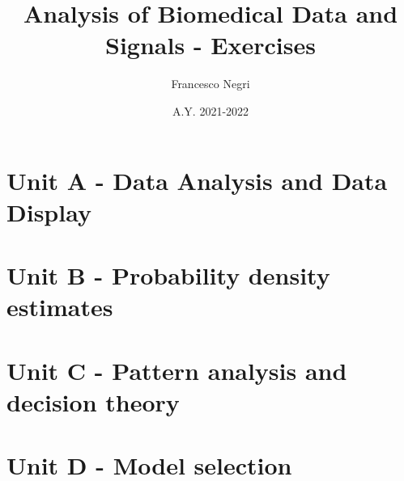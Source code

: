 \documentclass[12pt]{article}
\title{Analysis of Biomedical Data and Signals - Exercises}
\author{Francesco Negri}
\date{A.Y. 2021-2022}
\begin{document}
\maketitle

\section*{Unit A - Data Analysis and Data Display}
\graphicspath{ {./unit_A/images/} }
\begin{ExerciseList}
    
    
    
    
    
\end{ExerciseList}
\newpage

\section*{Unit B - Probability density estimates}
\graphicspath{ {./unit_B/images/} }
\begin{ExerciseList}
    
    
    
    
    
    
    
    
    
    
    
    
    
\end{ExerciseList}
\newpage

\section*{Unit C - Pattern analysis and decision theory}
\graphicspath{ {./unit_C/images/} }
\begin{ExerciseList}
    
    
    
    
    
    
    
    
    
    
    
    
    
    
    
    
\end{ExerciseList}
\newpage

\section*{Unit D - Model selection}
\newpage
\end{document}
